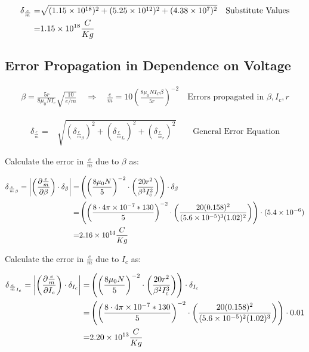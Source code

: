 \documentclass[12pt]{article}
\newcommand{\paren}[1]{\left( {#1} \right)}
\newcommand{\abs}[1]{\left| {#1} \right|}
\begin{document}
\begin{align}
	\delta_\frac{e}{m} =& \sqrt{(1.15\times10^{18})^2+(5.25\times10^{12})^2+(4.38\times10^7)^2} && \text{Substitute Values} \notag \\
	=& 1.15\times10^{18} \frac{C}{Kg} \label{v:FixV_err}
\end{align}

\clearpage

\subsection{Error Propagation in Dependence on Voltage} \label{sec:FixedAmpsErr}

\begin{align}
	\beta = \frac{5r}{8\mu_0N I_c}\sqrt{\frac{10}{e/m}}
	\quad \Rightarrow \quad
	\frac{e}{m}=10\paren{\frac{8\mu_0N I_C\beta}{5r}}^{-2}
	\quad \text{Errors propagated in }\beta, I_c, r
	\label{e:em_derive_FixA}
\end{align}

\begin{align}
	\delta_\frac{e}{m}=&\sqrt{\paren{\delta_{\frac{e}{m}_\beta}}^2+\paren{\delta_{\frac{e}{m}_{I_c}}}^2+\paren{\delta_{\frac{e}{m}_r}}^2} \qquad \text{General Error Equation} \label{e:FixA_err}
\end{align}

Calculate the error in $\frac{e}{m}$ due to $\beta$ as:

\begin{align}
	\delta_{\frac{e}{m}_\beta} = \abs{\paren{\frac{\partial \frac{e}{m}}{\partial \beta}}\cdot\delta_\beta} =& \paren{\paren{\frac{8\mu_0N}{5}}^{-2}\cdot\paren{\frac{20r^2}{\beta^3I_c^2}}}\cdot\delta_\beta \label{e:FixA_err_beta} \\
	=& \paren{\paren{\frac{8\cdot4\pi\times10^{-7}*130}{5}}^{-2}\cdot\paren{\frac{20(0.158)^2}{(5.6\times10^{-5})^3(1.02)^2}}}\cdot(5.4\times10^{-6}) \notag \\
	=& 2.16\times10^{14} \frac{C}{Kg} \notag
\end{align}

Calculate the error in $\frac{e}{m}$ due to $I_c$ as:

\begin{align}
	\delta_{\frac{e}{m}_{I_c}} = \abs{\paren{\frac{\partial \frac{e}{m}}{\partial I_c}}\cdot\delta_{I_c}} =& \paren{\paren{\frac{8\mu_0N}{5}}^{-2}\cdot\paren{\frac{20r^2}{\beta^2I_c^3}}}\cdot \delta_{I_c} \label{e:FixA_err_Ic} \\
	=& \paren{\paren{\frac{8\cdot4\pi\times10^{-7}*130}{5}}^{-2}\cdot\paren{\frac{20(0.158)^2}{(5.6\times10^{-5})^2(1.02)^3}}}\cdot0.01 \notag \\
	=& 2.20\times10^{13} \frac{C}{Kg} \notag
\end{align}
\end{document}
